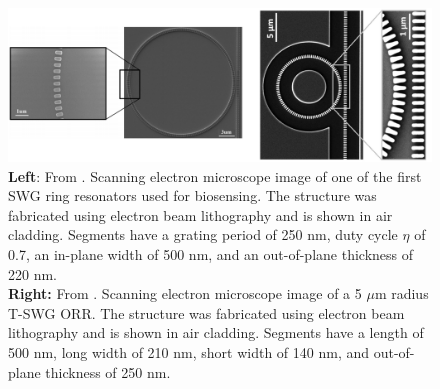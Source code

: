 \documentclass[aps,prl,twocolumn, superscriptaddress,nobalancelastpage]{revtex4}
\begin{document}








\pagebreak
\onecolumngrid

 \begin{figure}[!ht]
    \centering
    \includegraphics[width=15cm]{SWGSEM.png}
    \caption{\textbf{Left}: From \cite{swg3}. Scanning electron microscope image of one of the first SWG ring resonators used for biosensing. The structure was fabricated using electron beam lithography and is shown in air cladding. Segments have a grating period of 250 nm, duty cycle $\eta$ of 0.7,  an in-plane width of 500 nm, and an out-of-plane thickness of 220 nm.  \\ 
    \textbf{Right:} From  \cite{trapezoidal}. Scanning electron microscope image of a 5 $\mu$m radius T-SWG ORR. The structure was fabricated using electron beam lithography and is shown in air cladding. Segments have a length of 500 nm, long width of 210 nm, short width of 140 nm, and out-of-plane thickness of 250 nm.}
    \label{fig:swgSEM}
\end{figure}
\end{document}

